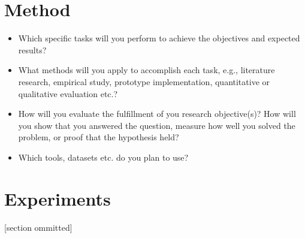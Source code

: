 \documentclass[akbc,twoside,11pt,lettersize]{article}
\begin{document}
  

\section{Method}
\label{method}

\begin{itemize}
    \item Which specific tasks will you perform to achieve the objectives and expected results?
    \item What methods will you apply to accomplish each task, e.g., literature research, empirical study, prototype implementation, quantitative or qualitative evaluation etc.?
    \item How will you evaluate the fulfillment of you research objective(s)? How will you show that you answered the question, measure how well you solved the problem, or proof that the hypothesis held? 
    \item Which tools, datasets etc. do you plan to use?
\end{itemize}



\section{Experiments}
\label{experiments}
 
    [section ommitted]



\end{document}
